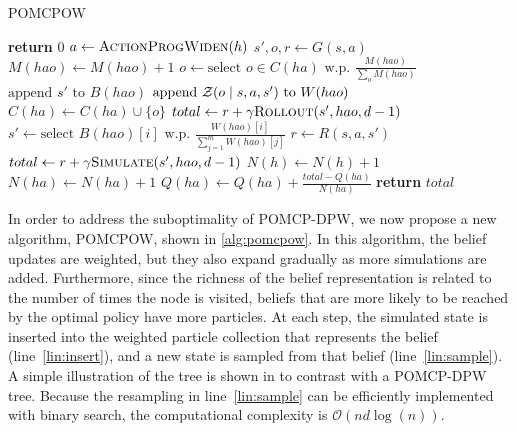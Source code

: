 \begin{algorithm}[htbp]
    \caption{POMCPOW} \label{alg:pomcpow}
    \begin{algorithmic}[1]
                \State \textbf{return} $0$
            \EndIf
            \State $a \gets \Call{ActionProgWiden}{h}$
            \State $s',o,r \gets G(s,a)$
                \State $M(hao) \gets M(hao) + 1$
            \Else
                \State $o \gets \text{select } o \in C(ha) \text{ w.p. } \frac{M(hao)}{\sum_{o} M(hao)}$
            \EndIf
            \State $\text{append } s' \text{ to } B(hao)$ \label{lin:insert}
            \State $\text{append } \mathcal{Z}(o \mid s, a, s') \text{ to } W(hao)$ \label{lin:weight}
             
                \State $C(ha) \gets C(ha) \cup \{o\}$
                \State $total \gets r + \gamma \Call{Rollout}{s', hao, d-1}$
            \Else
                \State $s' \gets \text{select } B(hao)[i] \text{ w.p. } \frac{W(hao)[i]}{\sum_{j=1}^m W(hao)[j]}$ \label{lin:sample}
                \State $r \gets R(s,a,s')$
                \State $total \gets r + \gamma \Call{Simulate}{s', hao, d-1}$
            \EndIf
            \State $N(h) \gets N(h)+1$
            \State $N(ha) \gets N(ha)+1$
            \State $Q(ha) \gets Q(ha) + \frac{total - Q(ha)}{N(ha)}$
            \State \textbf{return} $total$
        \EndProcedure
    \end{algorithmic}
\end{algorithm}


In order to address the suboptimality of POMCP-DPW, we now propose a new algorithm, POMCPOW, shown in \cref{alg:pomcpow}.
In this algorithm, the belief updates are weighted, but they also expand gradually as more simulations are added.
Furthermore, since the richness of the belief representation is related to the number of times the node is visited, beliefs that are more likely to be reached by the optimal policy have more particles.
At each step, the simulated state is inserted into the weighted particle collection that represents the belief (line~\ref{lin:insert}), and a new state is sampled from that belief (line~\ref{lin:sample}).
A simple illustration of the tree is shown in  to contrast with a POMCP-DPW tree.
Because the resampling in line~\ref{lin:sample} can be efficiently implemented with binary search, the computational complexity is $\mathcal{O}(n d \log(n))$.


